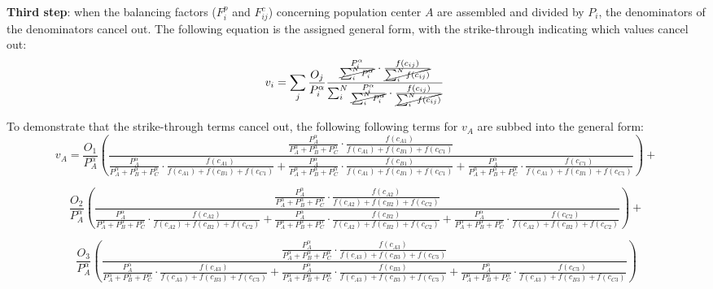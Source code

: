 \documentclass[10pt,letterpaper]{article}
\begin{document}
\begin{landscape}
\textbf{Third step}: when the balancing factors ($F^p_{i}$ and $F^c_{ij}$) concerning population center $A$ are assembled and divided by $P_i$, the denominators of the denominators cancel out. The following equation is the assigned general form, with the strike-through indicating which values cancel out:
$$
v_{i} = \sum_{j}\frac{O_j}{P_{i }^\alpha}\frac{\frac{P_{i}^\alpha}{\cancel{\sum_{i}^N P_{i}^\alpha}} \cdot \frac{f(c_{ij})}{\cancel{\sum_{i}^N f(c_{ij})}}}{\sum_{i}^N \frac{P_{i}^\alpha}{\cancel{\sum_{i}^N P_{i}^\alpha}} \cdot \frac{f(c_{ij})}{\cancel{\sum_{i}^N f(c_{ij})}}}\
$$

To demonstrate that the strike-through terms cancel out, the following following terms for $v_A$ are subbed into the general form:
$$
v_{A} = \frac{O_1}{P_{A}^\alpha}(\frac{\frac{P_{A}^\alpha}{P_{A}^\alpha+P_{B}^\alpha+P_{C}^\alpha} \cdot \frac{f(c_{A1})}{f(c_{A1})+f(c_{B1})+f(c_{C1})}}{\frac{P_{A}^\alpha}{P_{A}^\alpha+P_{B}^\alpha+P_{C}^\alpha} \cdot \frac{f(c_{A1})}{f(c_{A1})+f(c_{B1})+f(c_{C1})} + \frac{P_{A}^\alpha}{P_{A}^\alpha+P_{B}^\alpha+P_{C}^\alpha} \cdot \frac{f(c_{B1})}{f(c_{A1})+f(c_{B1})+f(c_{C1})}+ \frac{P_{A}^\alpha}{P_{A}^\alpha+P_{B}^\alpha+P_{C}^\alpha} \cdot \frac{f(c_{C1})}{f(c_{A1})+f(c_{B1})+f(c_{C1})}}) +
$$

$$
\frac{O_2}{P_{A}^\alpha}(\frac{\frac{P_{A}^\alpha}{P_{A}^\alpha+P_{B}^\alpha+P_{C}^\alpha} \cdot \frac{f(c_{A2})}{f(c_{A2})+f(c_{B2})+f(c_{C2})}}{\frac{P_{A}^\alpha}{P_{A}^\alpha+P_{B}^\alpha+P_{C}^\alpha} \cdot \frac{f(c_{A2})}{f(c_{A2})+f(c_{B2})+f(c_{C2})} + \frac{P_{A}^\alpha}{P_{A}^\alpha+P_{B}^\alpha+P_{C}^\alpha} \cdot \frac{f(c_{B2})}{f(c_{A2})+f(c_{B2})+f(c_{C2})}+\frac{P_{A}^\alpha}{P_{A}^\alpha+P_{B}^\alpha+P_{C}^\alpha} \cdot \frac{f(c_{C2})}{f(c_{A2})+f(c_{B2})+f(c_{C2})}} )+
$$

$$
\frac{O_3}{P_{A}^\alpha}(\frac{\frac{P_{A}^\alpha}{P_{A}^\alpha+P_{B}^\alpha+P_{C}^\alpha} \cdot \frac{f(c_{A3})}{f(c_{A3})+f(c_{B3})+f(c_{C3})}}{\frac{P_{A}^\alpha}{P_{A}^\alpha+P_{B}^\alpha+P_{C}^\alpha} \cdot \frac{f(c_{A3})}{f(c_{A3})+f(c_{B3})+f(c_{C3})} + \frac{P_{A}^\alpha}{P_{A}^\alpha+P_{B}^\alpha+P_{C}^\alpha} \cdot \frac{f(c_{B3})}{f(c_{A3})+f(c_{B3})+f(c_{C3})}+\frac{P_{A}^\alpha}{P_{A}^\alpha+P_{B}^\alpha+P_{C}^\alpha} \cdot \frac{f(c_{C3})}{f(c_{A3})+f(c_{B3})+f(c_{C3})}} )
$$


\end{landscape}
\end{document}
